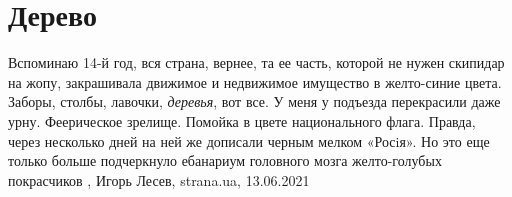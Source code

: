  
 
 
 
 
\chapter{Дерево}

Вспоминаю 14-й год, вся страна, вернее, та ее часть, которой не нужен скипидар
на жопу, закрашивала движимое и недвижимое имущество в желто-синие цвета.
Заборы, столбы, лавочки, \emph{деревья}, вот все. У меня у подъезда перекрасили даже
урну. Феерическое зрелище. Помойка в цвете национального флага. Правда, через
несколько дней на ней же дописали черным мелком «Росiя». Но это еще только
больше подчеркнуло ебанариум головного мозга желто-голубых покрасчиков
, 
Игорь Лесев, strana.ua, 13.06.2021

